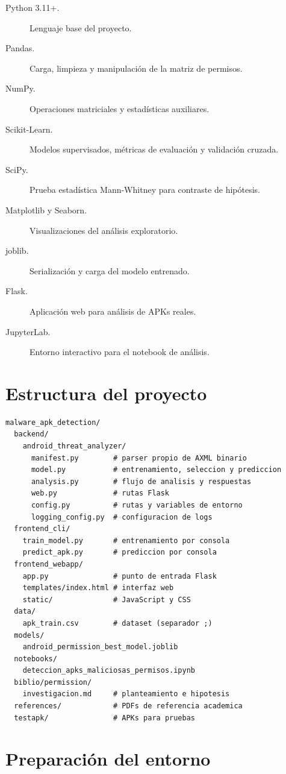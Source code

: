 \documentclass[
  coursetitle={Cómputo Nube y Tecnologías Emergentes},
  coursehours={96},
  coursedate={Verano 2026},
  doctype={Tutorial},
  otherlangs={english,french},
  authorname={Lázaro},
  authorsurname={Bustio-Martínez},
  authortitle={PhD},
  role={Profesor Investigador},
  email={lbustio@inaoe.mx},
  phone={5559504000},
  ext={7459},
  institution={Instituto Nacional de Astrofísica, Óptica y Electrónica (INAOE)},
  department={Maestría en Ciencias en Tecnologías de Seguridad},
  address={Luis Enrique Erro 1, Sta. Ma. Tonantzintla, San Andrés Cholula, CP 72840, Puebla, México},
  margin={0.5in}
]{../../lbustio_lecture_notes}
\begin{document}
\begin{description}
    \item[Python 3.11+.] Lenguaje base del proyecto.
    \item[Pandas.] Carga, limpieza y manipulación de la matriz de permisos.
    \item[NumPy.] Operaciones matriciales y estadísticas auxiliares.
    \item[Scikit-Learn.] Modelos supervisados, métricas de evaluación y validación cruzada.
    \item[SciPy.] Prueba estadística Mann-Whitney para contraste de hipótesis.
    \item[Matplotlib y Seaborn.] Visualizaciones del análisis exploratorio.
    \item[joblib.] Serialización y carga del modelo entrenado.
    \item[Flask.] Aplicación web para análisis de APKs reales.
    \item[JupyterLab.] Entorno interactivo para el notebook de análisis.
\end{description}

\section{Estructura del proyecto}

\begin{lstlisting}
malware_apk_detection/
  backend/
    android_threat_analyzer/
      manifest.py        # parser propio de AXML binario
      model.py           # entrenamiento, seleccion y prediccion
      analysis.py        # flujo de analisis y respuestas
      web.py             # rutas Flask
      config.py          # rutas y variables de entorno
      logging_config.py  # configuracion de logs
  frontend_cli/
    train_model.py       # entrenamiento por consola
    predict_apk.py       # prediccion por consola
  frontend_webapp/
    app.py               # punto de entrada Flask
    templates/index.html # interfaz web
    static/              # JavaScript y CSS
  data/
    apk_train.csv        # dataset (separador ;)
  models/
    android_permission_best_model.joblib
  notebooks/
    deteccion_apks_maliciosas_permisos.ipynb
  biblio/permission/
    investigacion.md     # planteamiento e hipotesis
  references/            # PDFs de referencia academica
  testapk/               # APKs para pruebas
\end{lstlisting}

\section{Preparación del entorno}
\end{document}
